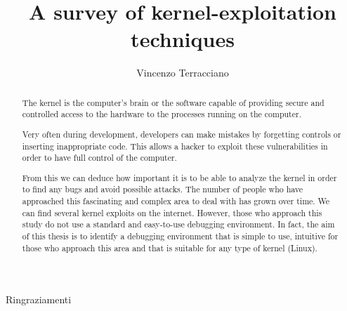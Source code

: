 \documentclass{masterthesis}
\begin{document}
\title{A survey of kernel-exploitation techniques}

\author{Vincenzo Terracciano}



\maketitle

\begin{abstract}
The kernel is the computer’s brain or the software capable of providing secure and controlled access to the hardware to the processes running on the computer.

Very often during development, developers can make mistakes by forgetting controls or inserting inappropriate code. This allows a hacker to exploit these vulnerabilities in order to have full control of the computer.

From this we can deduce how important it is to be able to analyze the kernel in order to find any bugs and avoid possible attacks. The number of people who have approached this fascinating and complex area to deal with has grown over time. We can find several kernel exploits on the internet. However, those who approach this study do not use a standard and easy-to-use debugging environment.
In fact, the aim of this thesis is to identify a debugging environment that is simple to use, intuitive for those who approach this area and that is suitable for any type of kernel (Linux).



\end{abstract}

\begin{acknowledgements}Ringraziamenti
\end{acknowledgements}


\tableofcontents
\end{document}
